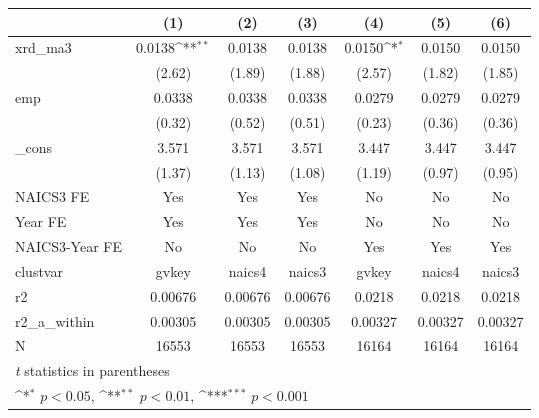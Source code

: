 {
\def\sym#1{\ifmmode^{#1}\else\(^{#1}\)\fi}
\begin{tabular}{l*{6}{c}}
\hline\hline
            &\multicolumn{1}{c}{(1)}         &\multicolumn{1}{c}{(2)}         &\multicolumn{1}{c}{(3)}         &\multicolumn{1}{c}{(4)}         &\multicolumn{1}{c}{(5)}         &\multicolumn{1}{c}{(6)}         \\
\hline
xrd\_ma3     &      0.0138\sym{**} &      0.0138         &      0.0138         &      0.0150\sym{*}  &      0.0150         &      0.0150         \\
            &      (2.62)         &      (1.89)         &      (1.88)         &      (2.57)         &      (1.82)         &      (1.85)         \\
[1em]
emp         &      0.0338         &      0.0338         &      0.0338         &      0.0279         &      0.0279         &      0.0279         \\
            &      (0.32)         &      (0.52)         &      (0.51)         &      (0.23)         &      (0.36)         &      (0.36)         \\
[1em]
\_cons      &       3.571         &       3.571         &       3.571         &       3.447         &       3.447         &       3.447         \\
            &      (1.37)         &      (1.13)         &      (1.08)         &      (1.19)         &      (0.97)         &      (0.95)         \\
[1em]
NAICS3 FE   &         Yes         &         Yes         &         Yes         &          No         &          No         &          No         \\
[1em]
Year FE     &         Yes         &         Yes         &         Yes         &          No         &          No         &          No         \\
[1em]
NAICS3-Year FE&          No         &          No         &          No         &         Yes         &         Yes         &         Yes         \\
\hline
clustvar    &       gvkey         &      naics4         &      naics3         &       gvkey         &      naics4         &      naics3         \\
r2          &     0.00676         &     0.00676         &     0.00676         &      0.0218         &      0.0218         &      0.0218         \\
r2\_a\_within &     0.00305         &     0.00305         &     0.00305         &     0.00327         &     0.00327         &     0.00327         \\
N           &       16553         &       16553         &       16553         &       16164         &       16164         &       16164         \\
\hline\hline
\multicolumn{7}{l}{\footnotesize \textit{t} statistics in parentheses}\\
\multicolumn{7}{l}{\footnotesize \sym{*} \(p<0.05\), \sym{**} \(p<0.01\), \sym{***} \(p<0.001\)}\\
\end{tabular}
}
